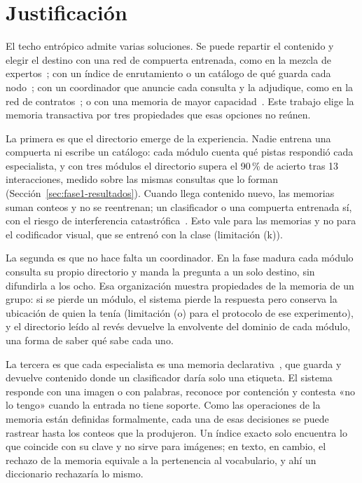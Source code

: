 \section{Justificación}

El techo entrópico admite varias soluciones.
Se puede repartir el contenido y elegir el destino con una red de compuerta entrenada,
como en la mezcla de expertos~\cite{jacobs1991adaptive,shazeer2017outrageously}; con un
índice de enrutamiento o un catálogo de qué guarda cada
nodo~\cite{crespo2002routing,callan2000distributed}; con un coordinador que anuncie cada
consulta y la adjudique, como en la red de contratos~\cite{smith1980contract}; o con una
memoria de mayor capacidad~\cite{krotov2016dense,ramsauer2021hopfield}.
Este trabajo elige la memoria transactiva por tres propiedades que esas opciones no
reúnen.

La primera es que el directorio emerge de la experiencia.
Nadie entrena una compuerta ni escribe un catálogo: cada módulo cuenta qué pistas
respondió cada especialista, y con tres módulos el directorio supera el 90\,\% de acierto
tras 13 interacciones, medido sobre las mismas consultas que lo forman (Sección~\ref{sec:fase1-resultados}).
Cuando llega contenido nuevo, las memorias suman conteos y no se reentrenan; un
clasificador o una compuerta entrenada sí, con el riesgo de interferencia
catastrófica~\cite{mccloskey1989catastrophic}.
Esto vale para las memorias y no para el codificador visual, que se entrenó con la clase
(limitación (k)).

La segunda es que no hace falta un coordinador.
En la fase madura cada módulo consulta su propio directorio y manda la pregunta a un
solo destino, sin difundirla a los ocho.
Esa organización muestra propiedades de la memoria de un grupo: si se pierde un módulo,
el sistema pierde la respuesta pero conserva la ubicación de quien la tenía (limitación
(o) para el protocolo de ese experimento), y el directorio leído al revés devuelve la
envolvente del dominio de cada módulo, una forma de saber qué sabe cada uno.

La tercera es que cada especialista es una memoria
declarativa~\cite{pineda2022weighted}, que guarda y devuelve contenido donde un
clasificador daría solo una etiqueta.
El sistema responde con una imagen o con palabras, reconoce por contención y contesta
«no lo tengo» cuando la entrada no tiene soporte.
Como las operaciones de la memoria están definidas formalmente, cada una de esas
decisiones se puede rastrear hasta los conteos que la produjeron.
Un índice exacto solo encuentra lo que coincide con su clave y no sirve para imágenes;
en texto, en cambio, el rechazo de la memoria equivale a la pertenencia al vocabulario, y
ahí un diccionario rechazaría lo mismo.


